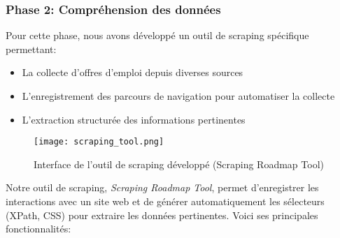 \documentclass[10pt,a4paper,twocolumn]{article}
\begin{document}
\subsubsection{Phase 2: Compréhension des données}
Pour cette phase, nous avons développé un outil de scraping spécifique permettant:
\begin{itemize}
    \item La collecte d'offres d'emploi depuis diverses sources
    \item L'enregistrement des parcours de navigation pour automatiser la collecte
    \item L'extraction structurée des informations pertinentes
\end{itemize}

\begin{figure}[H]
\centering
\texttt{[image: scraping\_tool.png]}
\caption{Interface de l'outil de scraping développé (Scraping Roadmap Tool)}
\end{figure}

Notre outil de scraping, \textit{Scraping Roadmap Tool}, permet d'enregistrer les interactions avec un site web et de générer automatiquement les sélecteurs (XPath, CSS) pour extraire les données pertinentes. Voici ses principales fonctionnalités:
\end{document}
